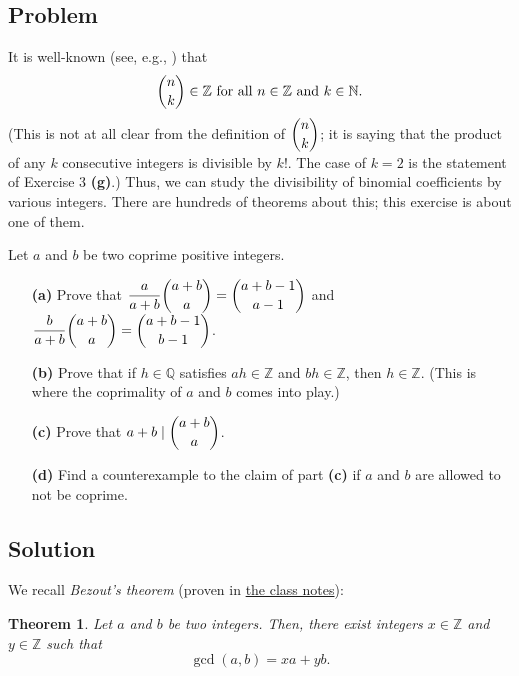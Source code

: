 \documentclass[paper=a4, fontsize=12pt]{scrartcl}%
\theoremstyle{plainsl}
\newtheorem{theorem}{Theorem}[section]
\theoremstyle{definition}
\theoremstyle{remark}
\begin{document}
\subsection{Problem}

It is well-known (see, e.g., \cite[Proposition 3.20]{detnotes}) that
\begin{equation}
\dbinom{n}{k}\in\mathbb{Z}\text{ for all }n\in\mathbb{Z}\text{ and }%
k\in\mathbb{N}. \label{eq.exe.binom.coprime-rat-cat-1.inZ}%
\end{equation}
(This is not at all clear from the definition of $\dbinom{n}{k}$; it is saying
that the product of any $k$ consecutive integers is divisible by $k!$. The
case of $k=2$ is the statement of Exercise 3 \textbf{(g)}.) Thus, we can study
the divisibility of binomial coefficients by various integers. There are
hundreds of theorems about this; this exercise is about one of them.

Let $a$ and $b$ be two coprime positive integers.

\begin{enumerate}
\item[\textbf{(a)}] Prove that $\dfrac{a}{a+b} \dbinom{a+b}{a} =
\dbinom{a+b-1}{a-1}$ and $\dfrac{b}{a+b} \dbinom{a+b}{a} = \dbinom{a+b-1}%
{b-1}$.

\item[\textbf{(b)}] Prove that if $h \in\mathbb{Q}$ satisfies $ah
\in\mathbb{Z}$ and $bh \in\mathbb{Z}$, then $h \in\mathbb{Z}$. (This is where
the coprimality of $a$ and $b$ comes into play.)

\item[\textbf{(c)}] Prove that $a+b \mid\dbinom{a+b}{a}$.

\item[\textbf{(d)}] Find a counterexample to the claim of part \textbf{(c)} if
$a$ and $b$ are allowed to not be coprime.
\end{enumerate}

\subsection{Solution}

We recall \textit{Bezout's theorem} (proven in
\href{http://www-users.math.umn.edu/~dgrinber/19s/notes.pdf}{the class notes}):

\begin{theorem}
\label{thm.ent.gcd.bezout}Let $a$ and $b$ be two integers. Then, there exist
integers $x\in\mathbb{Z}$ and $y\in\mathbb{Z}$ such that%
\[
\gcd\left(  a,b\right)  =xa+yb.
\]

\end{theorem}
\end{document}

